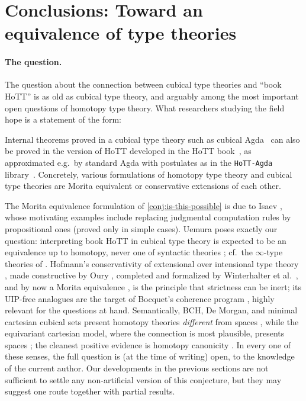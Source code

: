 \section{Conclusions: Toward an equivalence of type theories}\label{sec:conservativity}


\paragraph{The question.} The question about the connection between cubical type theories and ``book HoTT'' is as old as cubical type theory, and arguably among the most important open questions of homotopy type theory.
What researchers studying the field hope is a statement of the form:
\begin{conjecture}\label{conj:is-this-possible}
	Internal theorems proved in a cubical type theory such as cubical Agda~\citep{CubicalAgda} can also be proved in the version of HoTT developed in the HoTT book~\citep{HoTTBook}, as approximated e.g.\ by standard Agda with postulates as in the \texttt{HoTT-Agda} library~\citep{swan:hott-in:agda}.
	Concretely, various formulations of homotopy type theory and cubical type theories are Morita equivalent or conservative extensions of each other.
\end{conjecture}

The Morita equivalence formulation of \cref{conj:is-this-possible} is due to Isaev
\citep{Isaev2018Morita}, whose motivating examples include replacing
judgmental computation rules by propositional ones (proved only in simple
cases). Uemura poses exactly our question: interpreting book HoTT in
cubical type theory is expected to be an equivalence up to homotopy, never
one of syntactic theories \citep[\S8]{Uemura2023}; cf.\ the $\infty$-type
theories of \citet{NguyenUemura2025}.
Hofmann's conservativity of extensional over intensional type theory
\citep{Hofmann1995}, made constructive by Oury \citep{Oury2005}, completed and
formalized by Winterhalter et al.~\citep{WST2019,Winterhalter2020}, and by
now a Morita equivalence \citep{KapulkinLi2025Revisited}, is the principle that strictness can be inert; its UIP-free analogues are the target of Bocquet's coherence
program \citep{Bocquet2020,Bocquet2022,Bocquet2023,BKS2023}, highly relevant for the questions at hand.
%
Semantically, BCH, De Morgan,
and minimal cartesian cubical sets present homotopy theories
\emph{different} from spaces \citep{Sattler2018Talk,ACCRS2026}, while the
equivariant cartesian model, where the connection is most plausible,
presents spaces \citep{ACCRS2026,CavalloSattler2025,CavalloSattler2026}; the
cleanest positive evidence is homotopy canonicity
\citep{CHS2022,KapulkinSattler2019,BocquetRezk2023}. In every one of these
senses, the full question is (at the time of writing) open, to the knowledge of the current author.
Our developments in the previous sections are not sufficient to settle any non-artificial version of this conjecture, but they may suggest one route together with partial results.


